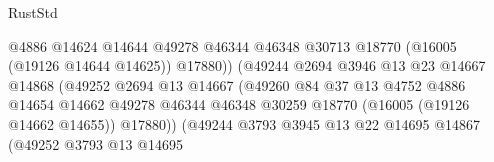 \begin{lexlean}{RustStd}
\begin{coremodule}
                                                @4886
                                                @14624
                                                @14644
                                                @49278
                                                @46344
                                                @46348
                                                @30713
                                                @18770
                                                (@16005 (@19126 @14644 @14625))
                                                @17880))
                                            (@49244
                                              @2694
                                              @3946
                                              @13
                                              @23
                                              @14667
                                              @14868
                                              (@49252
                                                @2694
                                                @13
                                                @14667
                                                (@49260
                                                  @84
                                                  @37
                                                  @13
                                                  @4752
                                                  @4886
                                                  @14654
                                                  @14662
                                                  @49278
                                                  @46344
                                                  @46348
                                                  @30259
                                                  @18770
                                                  (@16005 (@19126 @14662 @14655))
                                                  @17880))
                                              (@49244
                                                @3793
                                                @3945
                                                @13
                                                @22
                                                @14695
                                                @14867
                                                (@49252
                                                  @3793
                                                  @13
                                                  @14695

\end{coremodule}
\end{lexlean}
